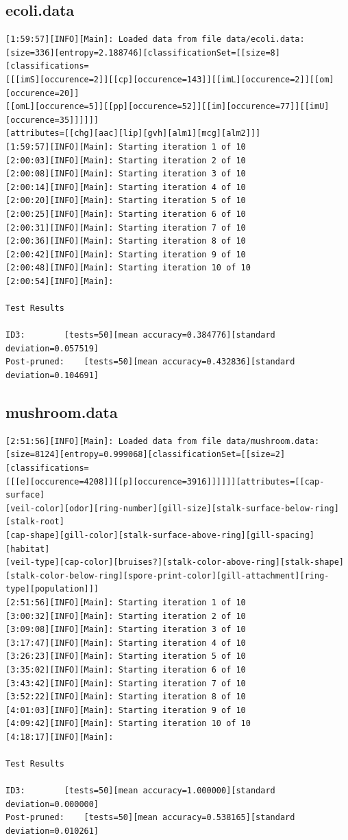 \documentclass[10pt]{report}
\begin{document}
\subsection*{ecoli.data}
{\small
\begin{verbatim}
[1:59:57][INFO][Main]: Loaded data from file data/ecoli.data:
[size=336][entropy=2.188746][classificationSet=[[size=8][classifications=
[[[imS][occurence=2]][[cp][occurence=143]][[imL][occurence=2]][[om][occurence=20]]
[[omL][occurence=5]][[pp][occurence=52]][[im][occurence=77]][[imU][occurence=35]]]]]]
[attributes=[[chg][aac][lip][gvh][alm1][mcg][alm2]]] 
[1:59:57][INFO][Main]: Starting iteration 1 of 10 
[2:00:03][INFO][Main]: Starting iteration 2 of 10 
[2:00:08][INFO][Main]: Starting iteration 3 of 10 
[2:00:14][INFO][Main]: Starting iteration 4 of 10 
[2:00:20][INFO][Main]: Starting iteration 5 of 10 
[2:00:25][INFO][Main]: Starting iteration 6 of 10 
[2:00:31][INFO][Main]: Starting iteration 7 of 10 
[2:00:36][INFO][Main]: Starting iteration 8 of 10 
[2:00:42][INFO][Main]: Starting iteration 9 of 10 
[2:00:48][INFO][Main]: Starting iteration 10 of 10 
[2:00:54][INFO][Main]: 

Test Results

ID3:		[tests=50][mean accuracy=0.384776][standard deviation=0.057519]
Post-pruned:	[tests=50][mean accuracy=0.432836][standard deviation=0.104691] 
\end{verbatim}
}


\subsection*{mushroom.data}
{\small
\begin{verbatim}
[2:51:56][INFO][Main]: Loaded data from file data/mushroom.data:
[size=8124][entropy=0.999068][classificationSet=[[size=2][classifications=
[[[e][occurence=4208]][[p][occurence=3916]]]]]][attributes=[[cap-surface]
[veil-color][odor][ring-number][gill-size][stalk-surface-below-ring][stalk-root]
[cap-shape][gill-color][stalk-surface-above-ring][gill-spacing][habitat]
[veil-type][cap-color][bruises?][stalk-color-above-ring][stalk-shape]
[stalk-color-below-ring][spore-print-color][gill-attachment][ring-type][population]]] 
[2:51:56][INFO][Main]: Starting iteration 1 of 10 
[3:00:32][INFO][Main]: Starting iteration 2 of 10 
[3:09:08][INFO][Main]: Starting iteration 3 of 10 
[3:17:47][INFO][Main]: Starting iteration 4 of 10  
[3:26:23][INFO][Main]: Starting iteration 5 of 10 
[3:35:02][INFO][Main]: Starting iteration 6 of 10 
[3:43:42][INFO][Main]: Starting iteration 7 of 10 
[3:52:22][INFO][Main]: Starting iteration 8 of 10 
[4:01:03][INFO][Main]: Starting iteration 9 of 10 
[4:09:42][INFO][Main]: Starting iteration 10 of 10 
[4:18:17][INFO][Main]: 

Test Results

ID3:		[tests=50][mean accuracy=1.000000][standard deviation=0.000000]
Post-pruned:	[tests=50][mean accuracy=0.538165][standard deviation=0.010261] 
\end{verbatim}
}
\end{document}
